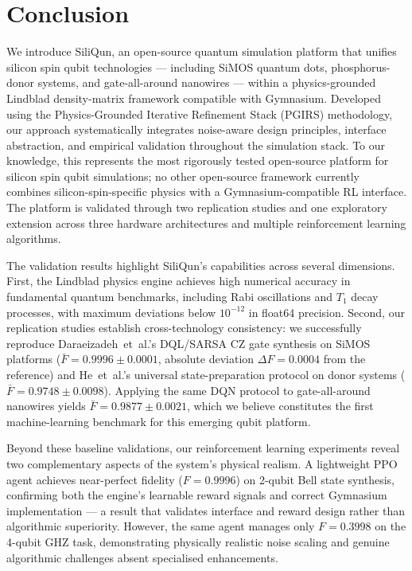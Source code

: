 \section{Conclusion}
\label{sec:conclusion}

We introduce SiliQun, an open-source quantum simulation platform that unifies silicon spin qubit technologies — including SiMOS quantum dots, phosphorus-donor systems, and gate-all-around nanowires — within a physics-grounded Lindblad density-matrix framework compatible with Gymnasium. Developed using the Physics-Grounded Iterative Refinement Stack (PGIRS) methodology, our approach systematically integrates noise-aware design principles, interface abstraction, and empirical validation throughout the simulation stack. To our knowledge, this represents the most rigorously tested open-source platform for silicon spin qubit simulations; no other open-source framework currently combines silicon-spin-specific physics with a Gymnasium-compatible RL interface. The platform is validated through two replication studies and one exploratory extension across three hardware architectures and multiple reinforcement learning algorithms.

The validation results highlight SiliQun's capabilities across several dimensions. First, the Lindblad physics engine achieves high numerical accuracy in fundamental quantum benchmarks, including Rabi oscillations and $T_1$ decay processes, with maximum deviations below $10^{-12}$ in float64 precision. Second, our replication studies establish cross-technology consistency: we successfully reproduce Daraeizadeh~et~al.'s DQL/SARSA CZ gate synthesis on SiMOS platforms ($\bar{F} = 0.9996 \pm 0.0001$, absolute deviation $\Delta F = 0.0004$ from the reference) and He~et~al.'s universal state-preparation protocol on donor systems ($\bar{F} = 0.9748 \pm 0.0098$). Applying the same DQN protocol to gate-all-around nanowires yields $\bar{F} = 0.9877 \pm 0.0021$, which we believe constitutes the first machine-learning benchmark for this emerging qubit platform.

Beyond these baseline validations, our reinforcement learning experiments reveal two complementary aspects of the system's physical realism. A lightweight PPO agent achieves near-perfect fidelity ($F = 0.9996$) on 2-qubit Bell state synthesis, confirming both the engine's learnable reward signals and correct Gymnasium implementation — a result that validates interface and reward design rather than algorithmic superiority. However, the same agent manages only $F = 0.3998$ on the 4-qubit GHZ task, demonstrating physically realistic noise scaling and genuine algorithmic challenges absent specialised enhancements.

